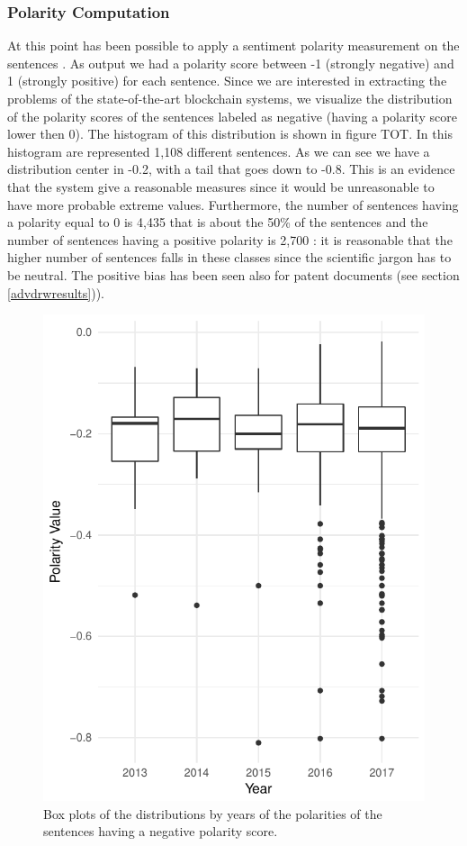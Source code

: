 \documentclass[]{book}
\theoremstyle{definition}
\theoremstyle{definition}
\theoremstyle{definition}
\theoremstyle{remark}
\begin{document}
\subsubsection*{Polarity Computation}\label{polarity-computation}

At this point has been possible to apply a sentiment polarity
measurement on the sentences \citep{sentimentr2018}. As output we had a
polarity score between -1 (strongly negative) and 1 (strongly positive)
for each sentence. Since we are interested in extracting the problems of
the state-of-the-art blockchain systems, we visualize the distribution
of the polarity scores of the sentences labeled as negative (having a
polarity score lower then 0). The histogram of this distribution is
shown in figure TOT. In this histogram are represented 1,108 different
sentences. As we can see we have a distribution center in -0.2, with a
tail that goes down to -0.8. This is an evidence that the system give a
reasonable measures since it would be unreasonable to have more probable
extreme values. Furthermore, the number of sentences having a polarity
equal to 0 is 4,435 that is about the 50\% of the sentences and the
number of sentences having a positive polarity is 2,700 : it is
reasonable that the higher number of sentences falls in these classes
since the scientific jargon has to be neutral. The positive bias has
been seen also for patent documents (see section \ref{advdrwresults})).

\begin{figure}

{\centering \includegraphics[width=0.5\linewidth]{_bookdown_files/figures/polarity_histogram_time_bl} 

}

\caption{Box plots of the distributions  by years of the polarities of the sentences having a negative polarity score.}\label{fig:sentintimebl}
\end{figure}
\end{document}
